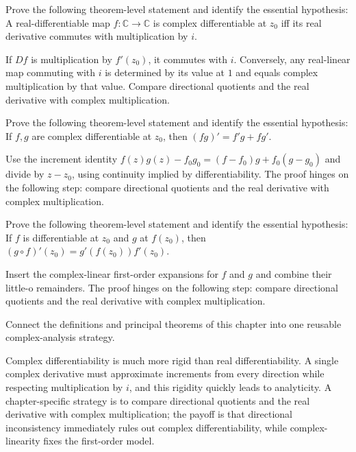 \begin{problem}\label{prob:iv01-problem-09}
Prove the following theorem-level statement and identify the essential hypothesis: A real-differentiable map $f:\mathbb C\to\mathbb C$ is complex differentiable at $z_0$ iff its real derivative commutes with multiplication by $i$.
\end{problem}
\begin{solution}
If $Df$ is multiplication by $f'(z_0)$, it commutes with $i$. Conversely, any real-linear map commuting with $i$ is determined by its value at $1$ and equals complex multiplication by that value. Compare directional quotients and the real derivative with complex multiplication.
\end{solution}

\begin{problem}\label{prob:iv01-problem-10}
Prove the following theorem-level statement and identify the essential hypothesis: If $f,g$ are complex differentiable at $z_0$, then $(fg)'=f'g+fg'$.
\end{problem}
\begin{solution}
Use the increment identity $f(z)g(z)-f_0g_0=(f-f_0)g+f_0(g-g_0)$ and divide by $z-z_0$, using continuity implied by differentiability. The proof hinges on the following step: compare directional quotients and the real derivative with complex multiplication.
\end{solution}

\begin{problem}\label{prob:iv01-problem-11}
Prove the following theorem-level statement and identify the essential hypothesis: If $f$ is differentiable at $z_0$ and $g$ at $f(z_0)$, then $(g\circ f)'(z_0)=g'(f(z_0))f'(z_0)$.
\end{problem}
\begin{solution}
Insert the complex-linear first-order expansions for $f$ and $g$ and combine their little-o remainders. The proof hinges on the following step: compare directional quotients and the real derivative with complex multiplication.
\end{solution}

\begin{problem}\label{prob:iv01-problem-12}
Connect the definitions and principal theorems of this chapter into one reusable complex-analysis strategy.
\end{problem}
\begin{solution}
Complex differentiability is much more rigid than real differentiability. A single complex derivative must approximate increments from every direction while respecting multiplication by $i$, and this rigidity quickly leads to analyticity. A chapter-specific strategy is to compare directional quotients and the real derivative with complex multiplication; the payoff is that directional inconsistency immediately rules out complex differentiability, while complex-linearity fixes the first-order model.
\end{solution}

